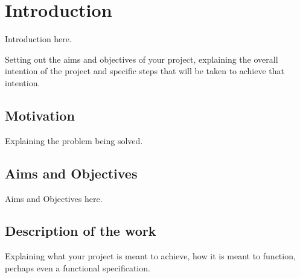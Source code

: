 \chapter{Introduction}

Introduction here.

Setting out the aims and objectives of your project, explaining the overall intention of the project and specific steps that will be taken to achieve that intention.

\section{Motivation}

Explaining the problem being solved.


\section{Aims and Objectives}

Aims and Objectives here.


\section{Description of the work}

Explaining what your project is meant to achieve, how it is meant to function, perhaps even a functional specification.



